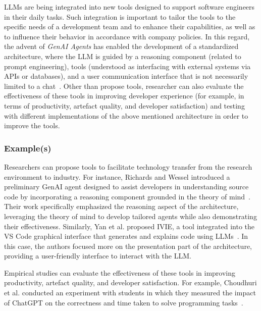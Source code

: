 LLMs are being integrated into new tools designed to support software engineers in their daily tasks.
Such integration is important to tailor the tools to the specific needs of a development team and to enhance their capabilities, as well as to influence their behavior in accordance with company policies.
In this regard, the advent of \textit{GenAI Agents} has enabled the development of a standardized architecture, where the LLM is guided by a reasoning component (related to prompt engineering), tools (understood as interfacing with external systems via APIs or databases), and a user communication interface that is not necessarily limited to a chat~\cite{DBLP:conf/icsm/RichardsW24, DBLP:journals/tmlr/SumersYN024, DBLP:journals/corr/abs-2309-07870}.
Other than propose tools, researcher can also evaluate the effectiveness of these tools in improving developer experience (for example, in terms of productivity, artefact quality, and developer satisfaction) and testing with different implementations of the above mentioned architecture in order to improve the tools.

\subsubsection{Example(s)}

Researchers can propose tools to facilitate technology transfer from the research environment to industry. 
For instance, Richards and Wessel introduced a preliminary GenAI agent designed to assist developers in understanding source code by incorporating a reasoning component grounded in the theory of mind~\cite{DBLP:conf/icsm/RichardsW24}. Their work specifically emphasized the reasoning aspect of the architecture, leveraging the theory of mind to develop tailored agents while also demonstrating their effectiveness.
Similarly, Yan et al. proposed IVIE, a tool integrated into the VS Code graphical interface that generates and explains code using LLMs~\cite{DBLP:conf/chi/YanHWH24}. In this case, the authors focused more on the presentation part of the architecture, providing a user-friendly interface to interact with the LLM. 

Empirical studies can evaluate the effectiveness of these tools in improving productivity, artefact quality, and developer satisfaction.
For example, Choudhuri et al. conducted an experiment with students in which they measured the impact of ChatGPT on the correctness and time taken to solve programming tasks~\cite{DBLP:conf/icse/ChoudhuriLSGS24}.

